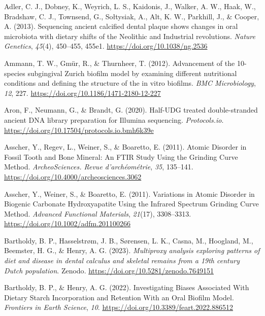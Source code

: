 \documentclass[
  b5paper,
]{book}
\newlength{\cslhangindent}
\newenvironment{CSLReferences}[2] %
 {\begin{list}{}{%
  \setlength{\itemindent}{0pt}
  \setlength{\leftmargin}{0pt}
  \setlength{\parsep}{0pt}
  \ifodd #1
   \setlength{\leftmargin}{\cslhangindent}
   \setlength{\itemindent}{-1\cslhangindent}
  \fi
  \setlength{\itemsep}{#2\baselineskip}}}
 {\end{list}}
\begin{document}
\label{refs-3}
\begin{CSLReferences}{1}{0}
Adler, C. J., Dobney, K., Weyrich, L. S., Kaidonis, J., Walker, A. W.,
Haak, W., Bradshaw, C. J., Townsend, G., Sołtysiak, A., Alt, K. W.,
Parkhill, J., \& Cooper, A. (2013). Sequencing ancient calcified dental
plaque shows changes in oral microbiota with dietary shifts of the
{Neolithic} and {Industrial} revolutions. \emph{Nature Genetics},
\emph{45}(4), 450--455, 455e1. \url{https://doi.org/10.1038/ng.2536}

Ammann, T. W., Gmür, R., \& Thurnheer, T. (2012). Advancement of the
10-species subgingival {Zurich} biofilm model by examining different
nutritional conditions and defining the structure of the in vitro
biofilms. \emph{BMC Microbiology}, \emph{12}, 227.
\url{https://doi.org/10.1186/1471-2180-12-227}

Aron, F., Neumann, G., \& Brandt, G. (2020). Half-{UDG} treated
double-stranded ancient {DNA} library preparation for {Illumina}
sequencing. \emph{Protocols.io}.
\url{https://doi.org/10.17504/protocols.io.bmh6k39e}

Asscher, Y., Regev, L., Weiner, S., \& Boaretto, E. (2011). Atomic
{Disorder} in {Fossil Tooth} and {Bone Mineral}: {An FTIR Study Using}
the {Grinding Curve Method}. \emph{ArcheoSciences. Revue
d'archéométrie}, \emph{35}, 135--141.
\url{https://doi.org/10.4000/archeosciences.3062}

Asscher, Y., Weiner, S., \& Boaretto, E. (2011). Variations in {Atomic
Disorder} in {Biogenic Carbonate Hydroxyapatite Using} the {Infrared
Spectrum Grinding Curve Method}. \emph{Advanced Functional Materials},
\emph{21}(17), 3308--3313. \url{https://doi.org/10.1002/adfm.201100266}

Bartholdy, B. P., Hasselstrøm, J. B., Sørensen, L. K., Casna, M.,
Hoogland, M., Beemster, H. G., \& Henry, A. G. (2023). \emph{Multiproxy
analysis exploring patterns of diet and disease in dental calculus and
skeletal remains from a 19th century {Dutch} population}. {Zenodo}.
\url{https://doi.org/10.5281/zenodo.7649151}

Bartholdy, B. P., \& Henry, A. G. (2022). Investigating {Biases
Associated With Dietary Starch Incorporation} and {Retention With} an
{Oral Biofilm Model}. \emph{Frontiers in Earth Science}, \emph{10}.
\url{https://doi.org/10.3389/feart.2022.886512}


\end{CSLReferences}
\end{document}
